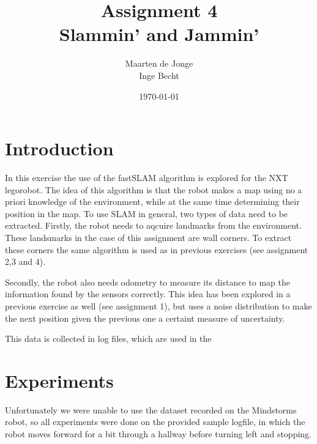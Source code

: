 \documentclass[a4paper, 20pt]{article}
\author{Maarten de Jonge \\
    Inge Becht}
\date{\today}
\title{Assignment 4\\ 
Slammin' and Jammin'}
\begin{document}
\maketitle
\section{Introduction}
In this exercise the use of the fastSLAM algorithm is explored for the NXT
legorobot. The idea of this algorithm is that the robot makes a map using no a
priori knowledge of the environment,
while at the same time determining their position in the map.
To use SLAM in general, two types of data need to be extracted.
Firstly, the robot needs to aqcuire landmarks from the
environment. These landsmarks in the case of this assignment are wall corners. To extract these
corners the same algorithm is used as in previous exercises (see assignment 2,3 and 4). 

Secondly, the robot also
needs odometry to measure its distance to map the information found by the
sensors correctly. This idea has been explored in a
previous exercise as well (see assignment 1), but uses a noise distribution to
make the next position given the previous one a certaint measure of uncertainty.

This data is collected in log files, which are used in the 

\section{Experiments}
Unfortunately we were unable to use the dataset recorded on the Mindstorms
robot, so all experiments were done on the provided sample logfile, in which the
robot moves forward for a bit through a hallway before turning left and
stopping.
\end{document}
